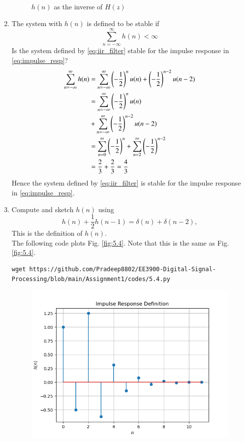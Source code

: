 \documentclass[journal,12pt,twocolumn]{IEEEtran}
\renewcommand\thesection{\arabic{section}}
\begin{document}
\begin{enumerate}[label=\thesection.\arabic*]
\begin{figure}[!ht]
\caption{$h(n)$ as the inverse of $H(z)$}
\label{fig:5.2}
\end{figure}
%
\item The system with $h(n)$ is defined to be stable if
\begin{equation}
\sum_{n=-\infty}^{\infty}h(n) < \infty
\end{equation}
Is the system defined by \eqref{eq:iir_filter} stable for the impulse response in \eqref{eq:impulse_resp}?\\
\solution 
\begin{align}
\sum_{n=-\infty}^{\infty} h(n) &= \sum_{n=-\infty}^{\infty} \left(-\frac{1}{2}\right)^{n}u(n) + \left(-\frac{1}{2}\right)^{n-2}u(n-2)\\
&= \sum_{n=-\infty}^{\infty} \left(-\frac{1}{2}\right)^{n}u(n) \\
&+\sum_{n=-\infty}^{\infty}  \left(-\frac{1}{2}\right)^{n-2}u(n-2)\\
&= \sum_{n=0}^{\infty} \left(-\frac{1}{2}\right)^{n} +
\sum_{n=2}^{\infty}  \left(-\frac{1}{2}\right)^{n-2}\\
&= \frac{2}{3}+\frac{2}{3}=\frac{4}{3}	
\end{align}
Hence the system defined by \eqref{eq:iir_filter} is stable for the impulse response in \eqref{eq:impulse_resp}.
%
\item 
Compute and sketch $h(n)$ using 
\begin{equation}
\label{eq:iir_filter_h}
h(n) + \frac{1}{2}h(n-1) = \delta(n) + \delta(n-2), 
\end{equation}
%
This is the definition of $h(n)$.
\\
\solution The following code plots Fig. \ref{fig:5.4}. Note that this is the same as Fig. 
\ref{fig:5.4}. 
%
\begin{lstlisting}
wget https://github.com/Pradeep8802/EE3900-Digital-Signal-Processing/blob/main/Assignment1/codes/5.4.py
\end{lstlisting}
\begin{figure}[!ht]
\centering
\includegraphics[width=\columnwidth]{./figs/5.4}

\end{figure}
\end{enumerate}
\end{document}
